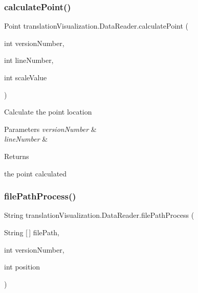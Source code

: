 \subsubsection{\texorpdfstring{calculate\+Point()}{calculatePoint()}}
{\footnotesize\ttfamily Point translation\+Visualization.\+Data\+Reader.\+calculate\+Point (\begin{DoxyParamCaption}\item[{int}]{version\+Number,  }\item[{int}]{line\+Number,  }\item[{int}]{scale\+Value }\end{DoxyParamCaption})\hspace{0.3cm}{\ttfamily [inline]}}

Calculate the point location 
\begin{DoxyParams}{Parameters}
{\em version\+Number} & \\
\hline
{\em line\+Number} & \\
\hline
\end{DoxyParams}
\begin{DoxyReturn}{Returns}


the point calculated 
\end{DoxyReturn}
\mbox{\label{classtranslation_visualization_1_1_data_reader_ad2803d802112687247d767d3a229ddb4}} 
\subsubsection{\texorpdfstring{file\+Path\+Process()}{filePathProcess()}}
{\footnotesize\ttfamily String translation\+Visualization.\+Data\+Reader.\+file\+Path\+Process (\begin{DoxyParamCaption}\item[{String \mbox{[}$\,$\mbox{]}}]{file\+Path,  }\item[{int}]{version\+Number,  }\item[{int}]{position }\end{DoxyParamCaption})\hspace{0.3cm}{\ttfamily [inline]}}


